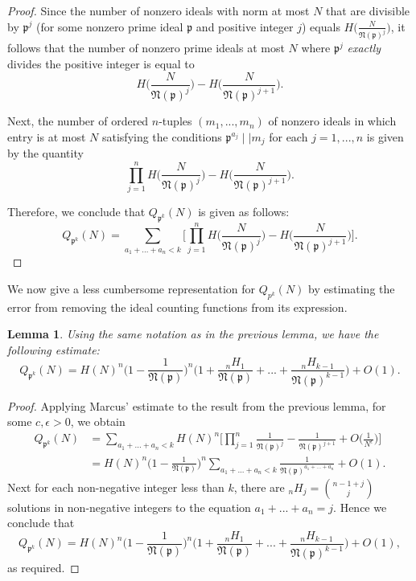 \documentclass[12pt]{amsart}
\newtheorem{lemma}[theorem]{Lemma}
\theoremstyle{definition}
\newcommand{\f}[1]{\mathfrak{#1}}
\begin{document}
\begin{proof}
	Since the number of nonzero ideals with norm at most $N$ that are divisible by $\f{p}^j$ (for some nonzero prime ideal $\f{p}$ and positive integer $j$) equals $H\big(\frac{N}{\f{N}(\f{p})^j}\big)$, it follows that the number of nonzero prime ideals at most $N$ where $\f{p}^j$ \textit{exactly} divides the positive integer is equal to
	$$H\bigg(\frac{N}{\f{N}(\f{p})^j}\bigg) - H\bigg(\frac{N}{\f{N}(\f{p})^{j+1}}\bigg).$$
	
	\noindent Next, the number of ordered $n$-tuples $(m_1, ..., m_n)$ of nonzero ideals in which entry is at most $N$ satisfying the conditions $\f{p}^{a_j} \mid\mid m_j$ for each $j = 1, ..., n$ is given by the quantity
	$$\prod_{j=1}^n H\bigg(\frac{N}{\f{N}(\f{p})^j}\bigg) - H\bigg(\frac{N}{\f{N}(\f{p})^{j+1}}\bigg).$$
	
	\noindent Therefore, we conclude that $Q_{\f{p}^k}(N)$ is given as follows:
	$$Q_{\f{p}^k}(N) = \sum_{a_1+...+a_n < k} \bigg[\prod_{j=1}^n H\bigg(\frac{N}{\f{N}(\f{p})^j}\bigg) - H\bigg(\frac{N}{\f{N}(\f{p})^{j+1}}\bigg)\bigg].$$ 
\end{proof}

We now give a less cumbersome representation for $Q_{p^k}(N)$ by estimating the error from removing the ideal counting functions from its expression.

\begin{lemma}
	Using the same notation as in the previous lemma, we have the following estimate:
	$$Q_{\f{p}^k}(N) = H(N)^n\Big(1 - \frac{1}{\f{N}(\f{p})}\Big)^n \Big(1 + \frac{{}_nH_1}{\f{N}(\f{p})} + ... + \frac{{}_nH_{k-1}}{\f{N}(\f{p})^{k-1}}\Big) + O(1).$$
\end{lemma}

\begin{proof}
	Applying Marcus' estimate to the result from the previous lemma, for some $c,\epsilon>0$, we obtain
	\begin{align*} 
		Q_{\f{p}^k}(N) &= \sum_{a_1+...+a_n < k} H(N)^n\Big[\prod_{j=1}^n \frac{1}{\f{N}(\f{p})^j}-\frac{1}{\f{N}(\f{p})^{j+1}}+O\bigg(\frac{1}{N^\epsilon}\bigg)\Big]\\ 
		&= H(N)^n\Big(1 - \frac{1}{\f{N}(\f{p})}\Big)^n \sum_{a_1+...+a_n < k} \frac{1}{\f{N}(\f{p})^{a_1 + ... + a_n}} + O(1). 
	\end{align*} 
	\noindent Next for each non-negative integer less than $k$, there are \small${}_nH_j = \binom{n-1+j}{j}\ $ \normalsize  solutions in non-negative integers to the equation $a_1+...+a_n = j$. Hence we conclude that
	$$Q_{\f{p}^k}(N) = H(N)^n\Big(1 - \frac{1}{\f{N}(\f{p})}\Big)^n \Big(1 + \frac{{}_nH_1}{\f{N}(\f{p})} + ... + \frac{{}_nH_{k-1}}{\f{N}(\f{p})^{k-1}}\Big) + O(1),$$
	as required.
\end{proof}
\end{document}
